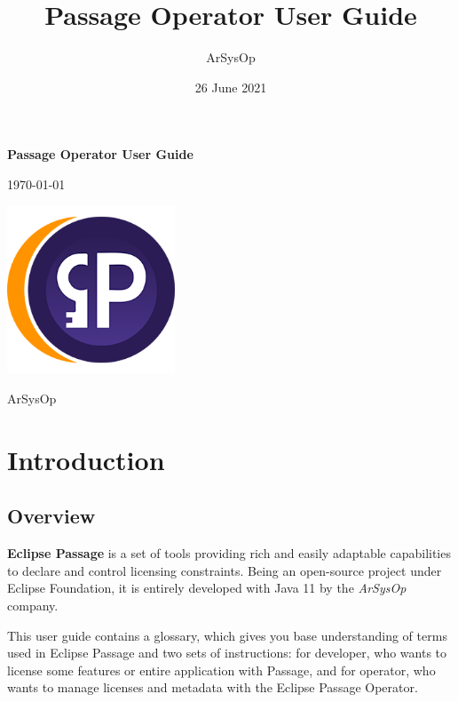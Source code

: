 \documentclass[12pt]{report}
\title{Passage Operator User Guide}
\author{ArSysOp}
\date{26 June 2021}
\begin{document}
\begin{titlepage}
    \begin{center}
        \vspace*{1cm}

        \Huge
        \textbf{Passage Operator User Guide}

        \vspace{0.5cm}

        \Large
        \today

        \vfill

        \includegraphics[width=5cm]{passage}

        \vfill

        \Large
        ArSysOp
    \end{center}
\end{titlepage}

\tableofcontents
{}

\chapter*{Introduction}

\section*{Overview}

\textbf{Eclipse Passage} is a set of tools providing rich and easily adaptable capabilities to declare and control licensing constraints.
Being an open-source project under Eclipse Foundation, it is entirely developed with Java 11 by the \textit{ArSysOp} company.

This user guide contains a glossary, which gives you base understanding of terms used in Eclipse Passage and two sets of instructions: for developer, who
wants to license some features or entire application with Passage, and for operator, who wants to manage licenses and metadata with the Eclipse Passage Operator.
\end{document}
